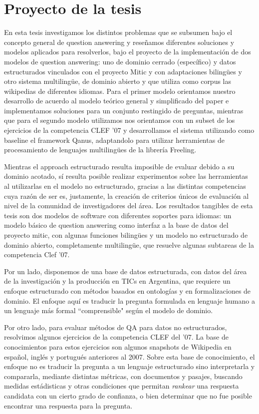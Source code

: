 \section{Proyecto de la tesis}
\label{sec:proyecto}

En esta tesis investigamos los distintos problemas que se subsumen bajo el concepto general de question answering y reseñamos diferentes soluciones y modelos aplicados para resolverlos, bajo el proyecto de la implementación de dos modelos de question answering: uno de dominio cerrado (específico) y datos estructurados vinculados con el proyecto Mitic y con adaptaciones bilingües y otro sistema multilingüe, de dominio abierto y que utiliza como corpus las wikipedias de diferentes idiomas. Para el primer modelo orientamos nuestro desarrollo de acuerdo al modelo teórico general y simplificado del paper \cite{QADB1} e implementamos soluciones para un conjunto restingido de preguntas, mientras que para el segundo modelo utilizamos nos orientamos con un subset de los ejercicios de la competencia CLEF '07 y desarrollamos el sistema utilizando como baseline el framework Qanus, adaptandolo para utilizar herramientas de procesamiento de lenguajes multilingües de la librería Freeling. 

Mientras el approach estructurado resulta imposible de evaluar debido a su dominio acotado, sí resulta posible realizar experimentos sobre las herramientas al utilizarlas en el modelo no estructurado, gracias a las distintas competencias cuya razón de ser es, justamente, la creación de criterios únicos de evaluación al nivel de la comunidad de investigadores del área. Los resultados tangibles de esta tesis son dos modelos de software con diferentes soportes para idiomas: un modelo básico de question answering como interfaz a la base de datos del proyecto mitic, con algunas funciones bilingües y un modelo no estructurado de dominio abierto, completamente multilingüe, que resuelve algunas subtareas de la competencia Clef '07.


Por un lado, disponemos de una base de datos estructurada, con datos del área de la investigación y la
producción en TICs en Argentina, que requiere un enfoque estructurado con métodos basados en ontologías y en 
formalizaciones de dominio. El enfoque aquí es traducir la pregunta formulada en lenguaje humano a un lenguaje más
formal ``comprensible" según el modelo de dominio. 

Por otro lado, para evaluar métodos de QA para datos no estructurados, resolvimos algunos ejercicios de la competencia CLEF del '07. La base de conocimientos para
estos ejercicios son algunos snapshots de Wikipedia en español, inglés y portugués anteriores al 2007. Sobre esta base de conocimiento,
el enfoque no es traducir la pregunta a un lenguaje estructurado sino interpretarla y compararla, mediante distintas métricas, 
con documentos y pasajes, buscando medidas estádisticas y otras condiciones que permitan \textit{rankear} una respuesta candidata
con un cierto grado de confianza, o bien determinar que no fue posible encontrar una respuesta para la pregunta. 



